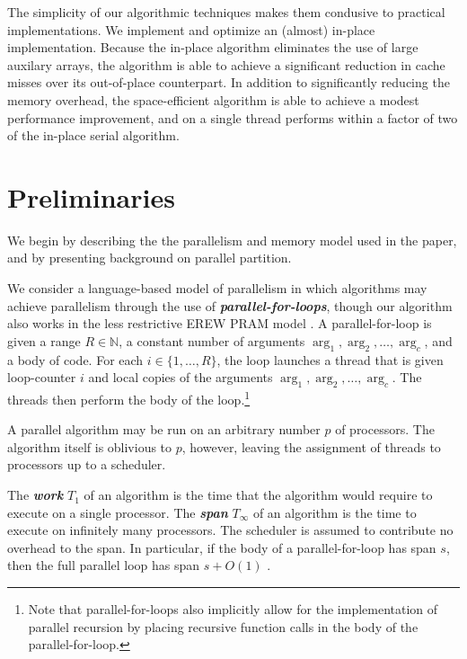 \documentclass[sigplan, twocolumn]{amsart}
\newcommand{\defn}[1]       {{\textit{\textbf{\boldmath #1}}}}
\renewcommand{\paragraph}[1]{\vspace{0.09in}\noindent{\bf \boldmath #1.}}
\theoremstyle{remark}
\theoremstyle{remark}
\begin{document}
The simplicity of our algorithmic techniques makes them condusive to
practical implementations. We implement and optimize an (almost)
in-place implementation. Because the in-place algorithm eliminates the
use of large auxilary arrays, the algorithm is able to achieve a
significant reduction in cache misses over its out-of-place
counterpart. In addition to significantly reducing the memory
overhead, the space-efficient algorithm is able to achieve a modest
performance improvement, and on a single thread performs within a
factor of two of the in-place serial algorithm.

\section{Preliminaries}\label{secprelim}

We begin by describing the the parallelism and memory model used in
the paper, and by presenting background on parallel partition.

\paragraph{Workflow Model} We consider a language-based model of parallelism in which algorithms may achieve parallelism
through the use of \defn{parallel-for-loops}, though our algorithm
also works in the less restrictive EREW PRAM model
\cite{Blelloch96,AcarBl16}.  A parallel-for-loop is given a range $R
\in \mathbb{N}$, a constant number of arguments $\arg_1, \arg_2,
\ldots, \arg_c$, and a body of code. For each $i \in \{1, \ldots,
R\}$, the loop launches a thread that is given loop-counter $i$ and
local copies of the arguments $\arg_1, \arg_2, \ldots, \arg_c$. The
threads then perform the body of the loop.\footnote{Note that
  parallel-for-loops also implicitly allow for the implementation of
  parallel recursion by placing recursive function calls in the body
  of the parallel-for-loop.}

A parallel algorithm may be run on an arbitrary number $p$ of
processors. The algorithm itself is oblivious to $p$, however, leaving
the assignment of threads to processors up to a scheduler.

The \defn{work} $T_1$ of an algorithm is the time that the algorithm
would require to execute on a single processor. The \defn{span}
$T_\infty$ of an algorithm is the time to execute on infinitely many
processors. The scheduler is assumed to contribute no overhead to the
span. In particular, if the body of a
parallel-for-loop has span $s$, then the full parallel loop has span
$s + O(1)$ \cite{Blelloch96,AcarBl16}.
\end{document}
